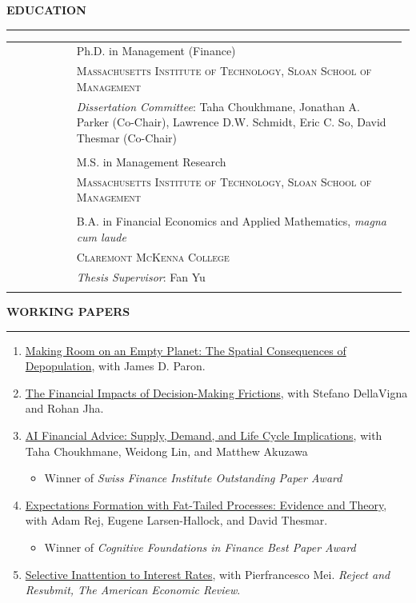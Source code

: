 \documentclass[a4paper, 10pt]{article}
\makeatletter
\newcounter{mycounter}
\newcommand{\cvsec}[1]
{
	\needspace{4\baselineskip}
	\noindent \textbf{#1}
	
	\vspace{2pt}
	
	\hrule
	
	\bigskip
}
\newcommand{\cvitem}[2]{#1 & #2 \\ & \\}
\newenvironment{cvchrono}[1]
{
	\cvsec{#1}
	\begin{longtable}{@{}>{\raggedright\arraybackslash}p{0.16\linewidth}@{\hspace{0.02\linewidth}}>{\raggedright\arraybackslash}p{0.82\linewidth}@{}}
}
{
	\end{longtable}
}
\newenvironment{cvcontinue}[1]
{
	\cvsec{#1}
	\begin{enumerate}
		\setcounter{enumi}{\themycounter}
	}
	{
	\setcounter{mycounter}{\theenumi}
	\end{enumerate}
}
\makeatother
\begin{document}
\begin{cvchrono}{EDUCATION}
	\cvitem{2024}{Ph.D. in Management (Finance) \\
		& \textsc{Massachusetts Institute of Technology, Sloan School of Management} \\
		& \emph{Dissertation Committee}: Taha Choukhmane, Jonathan A. Parker (Co-Chair), Lawrence D.W. Schmidt, Eric C. So, David Thesmar (Co-Chair)
		} 
	\cvitem{2021}{M.S. in Management Research \\
		& \textsc{Massachusetts Institute of Technology, Sloan School of Management}
		} 
	\cvitem{2018}{B.A. in Financial Economics and Applied Mathematics, \emph{magna cum laude} \\
		& \textsc{Claremont McKenna College} \\
		& \emph{Thesis Supervisor}: Fan Yu
		}
\end{cvchrono}

\begin{cvcontinue}{WORKING PAPERS}
	\item \href{https://www.timdesilva.me/files/papers/depopulation.pdf}{Making Room on an Empty Planet: The Spatial Consequences of Depopulation}, with James D. Paron.
	\item \href{https://www.timdesilva.me/files/papers/ddj_frictions.pdf}{The Financial Impacts of Decision-Making Frictions}, with Stefano DellaVigna and Rohan Jha.
	\item \href{https://www.timdesilva.me/files/papers/llm_advice.pdf}{AI Financial Advice: Supply, Demand, and Life Cycle Implications}, with Taha Choukhmane, Weidong Lin, and Matthew Akuzawa
	\begin{itemize}
		\item Winner of \emph{Swiss Finance Institute Outstanding Paper Award}
	\end{itemize}
	\item \href{https://www.timdesilva.me/files/papers/fat_tails.pdf}{Expectations Formation with Fat-Tailed Processes: Evidence and Theory}, with Adam Rej, Eugene Larsen-Hallock, and David Thesmar.
	\begin{itemize}
		\item Winner of \emph{Cognitive Foundations in Finance Best Paper Award}
	\end{itemize}
	\item \href{https://www.timdesilva.me/files/papers/si.pdf}{Selective Inattention to Interest Rates}, with Pierfrancesco Mei. \newline \textit{Reject and Resubmit, The American Economic Review}.
\end{cvcontinue}
\end{document}
